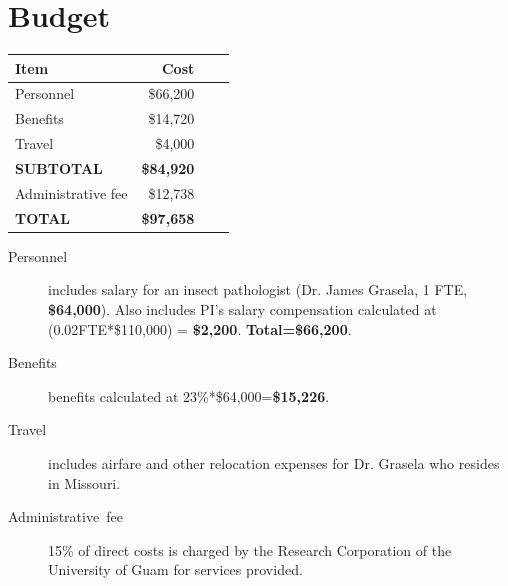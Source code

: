 \documentclass[12pt,letterpaper,english,bibliography=totocnumbered, abstract=on]{scrartcl}
\begin{document}
\newpage
\section{Budget}

\begin{table}[h]
	\centering
	\begin{tabular}{@{}lrrr@{}}
		\toprule
		\textbf{Item} & \textbf{Cost} \\ 
		\midrule
		Personnel & \$66,200 \\
		Benefits & \$14,720 \\
		Travel & \$4,000 \\
		\midrule
		\textbf{SUBTOTAL} & \textbf{\$84,920} \\ 
		\midrule
		Administrative fee & \$12,738 \\ 
		\midrule
		\textbf{TOTAL} & \textbf{\$97,658} \\ 
		\bottomrule
	\end{tabular}
\end{table}

\begin{description}
	
	\item [{Personnel}] includes salary for an insect pathologist (Dr. James Grasela, 1 FTE, \textbf{\$64,000}). Also includes PI's salary compensation calculated at (0.02FTE*\$110,000) = \textbf{\$2,200}. 
	\textbf{Total=\$66,200}.
	
	\item [{Benefits}] benefits calculated at 23\%*\$64,000=\textbf{\$15,226}.
	
	\item [{Travel}] includes airfare and other relocation expenses for Dr. Grasela who resides in Missouri.
	
	\item [{Administrative~fee}] 15\% of direct costs
	is charged by the Research Corporation of the University of Guam for
	services provided. 
	
\end{description}

\newpage
\printbibliography

\newpage{}

%
\end{document}
